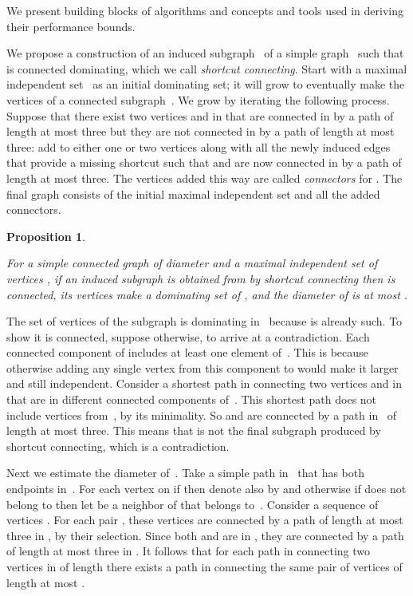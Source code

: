 \documentclass[11pt]{article}
\newcommand{\qed}{\hfill  \smallskip}
\newenvironment{proof}{\noindent{\bf Proof:}}{\qed}
\newtheorem{proposition}{Proposition}
\begin{document}
\label{sec:algorithmic-tools}




We present building blocks of algorithms and concepts and tools used in deriving their performance bounds.

We propose a construction of an induced subgraph~ of a simple graph~ such that  is connected dominating, which we call \emph{shortcut connecting}.
Start with a maximal independent set~ as an initial dominating set; it will grow to eventually  make the  vertices of a connected subgraph~.
We grow  by iterating the following process.
Suppose that there exist two vertices  and  in  that are connected in  by a path of length at most three but they are not connected in  by a path of length at most three: add to  either one or two vertices along with all the newly induced edges that provide a missing shortcut such that  and  are now connected in  by a path of length at most three.
The vertices added this way are called \emph{connectors} for .
The final graph  consists of the initial maximal independent set  and all the added connectors.




\begin{proposition}
\label{pro:shortcut-connecting-general}

For a simple connected graph  of diameter  and a maximal independent set of vertices , if an induced subgraph  is obtained from  by shortcut connecting then  is connected,  its vertices make a dominating set of , and the diameter of  is at most .
\end{proposition}

\begin{proof}
The set of vertices of the subgraph  is dominating in~ because  is already such.
To show it is connected, suppose otherwise, to arrive at a contradiction.
Each connected component of  includes at least one element of~.
This is because otherwise adding any single vertex from this component to  would make it larger and still independent.
Consider a shortest path in  connecting two vertices  and  in  that are in different connected components of~.
This shortest path does not include vertices from~, by its minimality. 
So  and  are connected by a path in~ of length at most three.
This means that  is not the final subgraph produced by shortcut connecting, which is a contradiction.

Next we estimate the diameter of~.
Take a simple path  in~ that has both endpoints in~.
For each vertex  on  if  then denote  also by  and otherwise if  does not belong to  then let  be a neighbor of  that belongs to~.
Consider a sequence of vertices .
For each pair , these vertices are connected by a path of length at most three in , by their selection.
Since both  and  are in , they are connected by a path of length at most three in .
It follows that for each path in  connecting two vertices in  of length  there exists a path in  connecting the same pair of vertices of length at most .
\end{proof}
\end{document}

